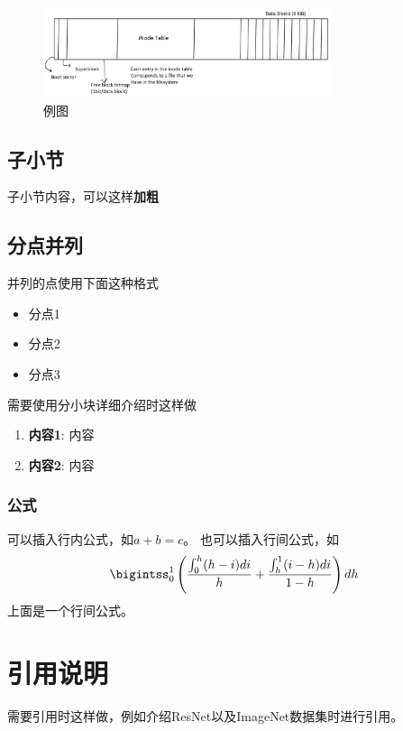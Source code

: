 \documentclass[a4paper]{article}
\begin{document}
\begin{figure}[H]
\centering
\includegraphics[width=0.75\textwidth]{img/sample.jpg}
\caption{\label{fig:BLayout}例图}
\end{figure}

\subsection{子小节}

子小节内容，可以这样\textbf{加粗}

\subsection{分点并列}

并列的点使用下面这种格式

\begin{itemize}
\item 分点1
\item 分点2
\item 分点3
\end{itemize}

需要使用分小块详细介绍时这样做

\begin{enumerate}
\item \textbf{内容1}: 内容
\item \textbf{内容2}: 内容
\end{enumerate}

\subsubsection{公式} 
可以插入行内公式，如$a+b = c$。
也可以插入行间公式，如
\begin{align*}
\bigintss_0^1 \left( \dfrac{\int_0^h (h-i)di}{h} + \dfrac{\int_h^1 (i-h)di}{1-h} \right) dh
\end{align*}
上面是一个行间公式。

\section{引用说明}
需要引用时这样做\cite{szegedy2015going}，例如介绍ResNet\cite{he2016deep}以及ImageNet\cite{russakovsky2015imagenet}数据集时进行引用。



\end{document}
